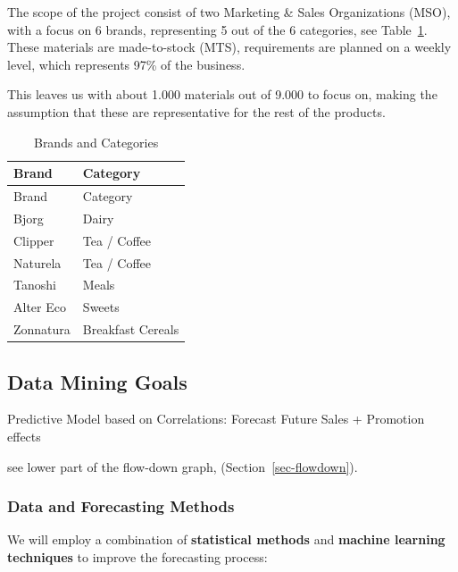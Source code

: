 \documentclass[
  american,
  10,
  a4paper,
]{book}
\theoremstyle{definition}
\theoremstyle{remark}
\begin{document}
The scope of the project consist of two Marketing \& Sales Organizations
(MSO), with a focus on 6 brands, representing 5 out of the 6 categories,
see Table~\ref{tbl-material-scope}. These materials are made-to-stock
(MTS), requirements are planned on a weekly level, which represents 97\%
of the business.

This leaves us with about 1.000 materials out of 9.000 to focus on,
making the assumption that these are representative for the rest of the
products.

\begin{longtable}[]{@{}ll@{}}
\caption{Brands and Categories}\label{tbl-material-scope}\tabularnewline
\toprule\noalign{}
Brand & Category \\
\midrule\noalign{}
\endfirsthead
\toprule\noalign{}
Brand & Category \\
\midrule\noalign{}
\endhead
\bottomrule\noalign{}
\endlastfoot
Bjorg & Dairy \\
Clipper & Tea / Coffee \\
Naturela & Tea / Coffee \\
Tanoshi & Meals \\
Alter Eco & Sweets \\
Zonnatura & Breakfast Cereals \\
\end{longtable}

\subsection{Data Mining Goals}\label{data-mining-goals}

Predictive Model based on Correlations: Forecast Future Sales +
Promotion effects

see lower part of the flow-down graph, (Section~\ref{sec-flowdown}).

\subsubsection*{Data and Forecasting
Methods}\label{data-and-forecasting-methods}

We will employ a combination of \textbf{statistical methods} and
\textbf{machine learning techniques} to improve the forecasting process:
\end{document}
